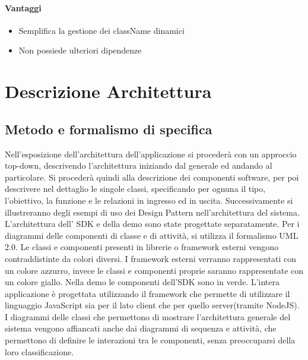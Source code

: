 \paragraph{Vantaggi}
\begin{itemize}
	\item Semplifica la gestione dei className dinamici 
	\item Non possiede ulteriori dipendenze 
\end{itemize}


\section{Descrizione Architettura}
\subsection{Metodo e formalismo di specifica}

Nell’esposizione dell’architettura dell’applicazione si procederà con
un approccio top-down, descrivendo l’architettura iniziando dal
generale ed andando al particolare. 
Si procederà quindi alla descrizione dei componenti software, per poi descrivere
nel dettaglio le singole classi, specificando per ognuna il tipo, l’obiettivo, la funzione e
le relazioni in ingresso ed in uscita.
Successivamente si illustreranno degli esempi di uso dei Design
Pattern nell’architettura del sistema. 
L'architettura dell' SDK e della demo sono state progettate separatamente.  
Per i diagrammi delle componenti di classe e di attività, si utilizza
il formalismo UML 2.0. Le classi e componenti presenti in librerie o
framework esterni vengono contraddistinte da colori diversi. I
framework esterni verranno rappresentati con un colore azzurro, invece
le classi e componenti proprie saranno rappresentate con un
colore giallo. Nella demo le componenti dell'SDK sono in verde.
L'intera applicazione è progettata utilizzando il framework
 che permette di utilizzare il linguaggio JavaScript
sia per il lato client che per quello server(tramite NodeJS). 
I diagrammi delle classi che permettono di mostrare l’architettura
generale del sistema vengono affiancati anche dai diagrammi di
sequenza e attività, che permettono di definire le interazioni tra le
componenti, senza preoccuparsi della loro classificazione. 




